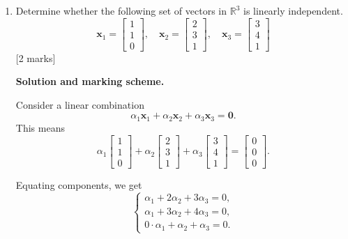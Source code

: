 \documentclass{article}
\begin{document}
\begin{enumerate}[label=(\alph*)]
    \item Determine whether the following set of vectors in $\mathbb{R}^3$ is linearly independent. 
    \[
    \bm{x}_1 = \left[ \begin{array}{c}
        1 \\ 1 \\ 0
    \end{array}\right], \quad \bm{x}_2 = \left[ \begin{array}{c}
        2 \\ 3 \\ 1
    \end{array}\right], \quad \bm{x}_3 = \left[ \begin{array}{c}
        3 \\ 4 \\ 1
    \end{array}\right]
    \]
    [2 marks]

    \begin{mdframed}[linecolor=black, linewidth=1pt]

    \textbf{Solution and marking scheme.}
    
    Consider a linear combination
    \[
    \alpha_1\mathbf{x}_1 + \alpha_2\mathbf{x}_2 + \alpha_3\mathbf{x}_3 = \mathbf{0}.
    \]
    This means
    \[
    \alpha_1
    \begin{bmatrix}1\\1\\0\end{bmatrix}
    +
    \alpha_2
    \begin{bmatrix}2\\3\\1\end{bmatrix}
    +
    \alpha_3
    \begin{bmatrix}3\\4\\1\end{bmatrix}
    =
    \begin{bmatrix}0\\0\\0\end{bmatrix}.
    \]
    
    Equating components, we get
    \[
    \begin{cases}
    \alpha_1 + 2\alpha_2 + 3\alpha_3 = 0,\\
    \alpha_1 + 3\alpha_2 + 4\alpha_3 = 0,\\
    0\cdot\alpha_1 + \alpha_2 + \alpha_3 = 0.
    \end{cases}
    \]
    

\end{mdframed}
\end{enumerate}
\end{document}
